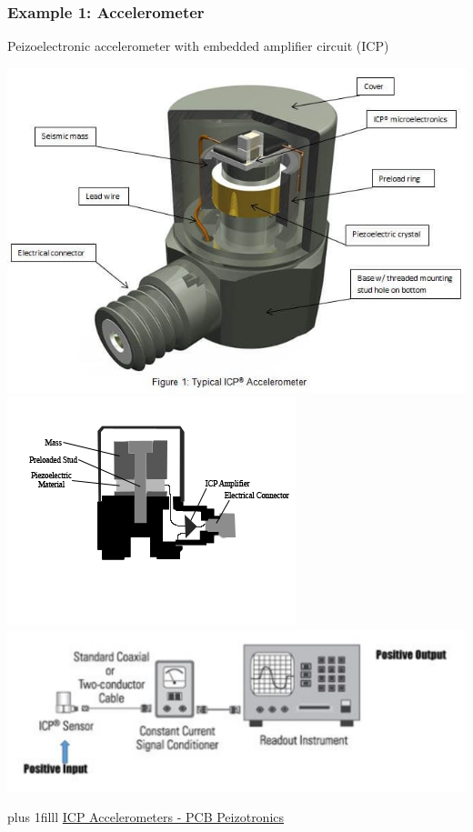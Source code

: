 \documentclass[fleqn]{beamer} %
\newcommand{\sectionIIsubsectionIIItitle}{Example 1: Accelerometer}
\newcommand{\btVFill}{\vskip0pt plus 1filll}
\begin{document}
			\begin{frame}
			\frametitle{\sectionIIsubsectionIIItitle}
			\scriptsize	   

				Peizoelectronic accelerometer with embedded amplifier circuit (ICP)                            
 
			 	\includegraphics[scale=.2]{images/ICP-accel1.jpg} 
			    \includegraphics[scale=3.0]{images/PiezoAccel.jpg}
			    \includegraphics[scale=.35]{images/icp_accel_wiring.png}
			    
			    \btVFill
			    {\tiny \href{https://www.pcb.com/resources/technical-information/introduction-to-accelerometers}{ICP Accelerometers - PCB Peizotronics} }

			\end{frame}
\end{document}
